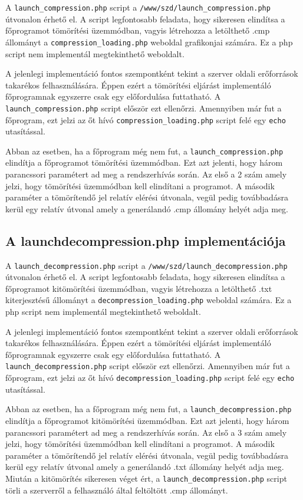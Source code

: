 \documentclass[oneside,titlepage,12pt,a4paper]{report}
\begin{document}
A \texttt{launch\_compression.php} script a \texttt{/www/szd/launch\_compression.php} útvonalon érhető el. A script legfontosabb feladata, hogy sikeresen elindítsa a főprogramot tömörítési üzemmódban, vagyis létrehozza a letölthető .cmp állományt a \texttt{compression\_loading.php} weboldal grafikonjai számára. Ez a php script nem implementál megtekinthető weboldalt.
\par A jelenlegi implementáció fontos szempontként tekint a szerver oldali erőforrások takarékos felhasználására. Éppen ezért a tömörítési eljárást implementáló főprogramnak egyszerre csak egy előfordulása futtatható. A \texttt{launch\_compression.php} script először ezt ellenőrzi. Amennyiben már fut a főprogram, ezt jelzi az őt hívó \texttt{compression\_loading.php} script felé egy \texttt{echo} utasítással. 
\par Abban az esetben, ha a főprogram még nem fut, a \texttt{launch\_compression.php}  elindítja a főprogramot tömörítési üzemmódban. Ezt azt jelenti, hogy három parancssori paramétert ad meg a rendszerhívás során. Az első a 2 szám amely jelzi, hogy tömörítési üzemmódban kell elindítani a programot. A második paraméter a tömörítendő jel relatív elérési útvonala, vegül pedig továbbadásra kerül egy relatív útvonal amely a generálandó .cmp állomány helyét adja meg.

\subsection{A launchdecompression.php implementációja}

A \texttt{launch\_decompression.php} script a \texttt{/www/szd/launch\_decompression.php} útvonalon érhető el. A script legfontosabb feladata, hogy sikeresen elindítsa a főprogramot kitömörítési üzemmódban, vagyis létrehozza a letölthető .txt kiterjesztésű állományt a \texttt{decompression\_loading.php} weboldal számára. Ez a php script nem implementál megtekinthető weboldalt.
\par A jelenlegi implementáció fontos szempontként tekint a szerver oldali erőforrások takarékos felhasználására. Éppen ezért a tömörítési eljárást implementáló főprogramnak egyszerre csak egy előfordulása futtatható. A \texttt{launch\_decompression.php} script először ezt ellenőrzi. Amennyiben már fut a főprogram, ezt jelzi az őt hívó \texttt{decompression\_loading.php} script felé egy \texttt{echo} utasítással. 
\par Abban az esetben, ha a főprogram még nem fut, a \texttt{launch\_decompression.php}  elindítja a főprogramot kitömörítési üzemmódban. Ezt azt jelenti, hogy három parancssori paramétert ad meg a rendszerhívás során. Az első a 3 szám amely jelzi, hogy tömörítési üzemmódban kell elindítani a programot. A második paraméter a tömörítendő jel relatív elérési útvonala, vegül pedig továbbadásra kerül egy relatív útvonal amely a generálandó .txt állomány helyét adja meg. Miután a kitömörítés sikeresen véget ért, a \texttt{launch\_decompression.php} script törli a szerverről a felhasználó által feltöltött .cmp állományt. 
\end{document}
